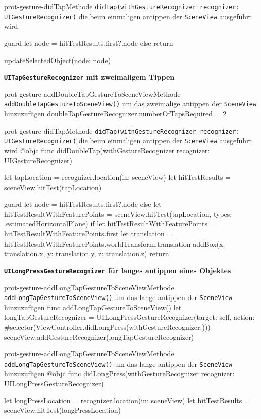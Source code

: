 \begin{description}
\begin{code}{prot-gesture-didTap}{Methode \texttt{didTap(withGestureRecognizer recognizer: UIGestureRecognizer)} die beim einmaligen antippen der \texttt{SceneView} ausgeführt wird}
{        guard let node = hitTestResults.first?.node else {return}
        
        updateSelectedObject(node: node)
    }
    \end{code}

    \textbf{\texttt{UITapGestureRecognizer} mit zweimaligem Tippen}\\

    \begin{code}{prot-gesture-addDoubleTapGestureToSceneView}{Methode \texttt{addDoubleTapGestureToSceneView()} um das zweimalige antippen der \texttt{SceneView} hinzuzufügen}
    doubleTapGestureRecognizer.numberOfTapsRequired = 2
    \end{code}

    \begin{code}{prot-gesture-didTap}{Methode \texttt{didTap(withGestureRecognizer recognizer: UIGestureRecognizer)} die beim einmaligen antippen der \texttt{SceneView} ausgeführt wird}
    @objc
    func didDoubleTap(withGestureRecognizer recognizer: UIGestureRecognizer) {
        let tapLocation = recognizer.location(in: sceneView)
        let hitTestResults = sceneView.hitTest(tapLocation)
        
        guard let node = hitTestResults.first?.node else {
            let hitTestResultWithFeaturePoints = sceneView.hitTest(tapLocation, types: .estimatedHorizontalPlane)
            if let hitTestResultWithFeaturePoints = hitTestResultWithFeaturePoints.first {
                let translation = hitTestResultWithFeaturePoints.worldTransform.translation
                addBox(x: translation.x, y: translation.y, z: translation.z)
            }
            return
        }
    }
    \end{code}

    \textbf{\texttt{UILongPressGestureRecognizer} für langes antippen eines Objektes}\\

    \begin{code}{prot-gesture-addLongTapGestureToSceneView}{Methode \texttt{addLongTapGestureToSceneView()} um das lange antippen der \texttt{SceneView} hinzuzufügen}
    func addLongTapGestureToSceneView() {
        let longTapGestureRecognizer = UILongPressGestureRecognizer(target: self, action: #selector(ViewController.didLongPress(withGestureRecognizer:)))
        sceneView.addGestureRecognizer(longTapGestureRecognizer)
    }
    \end{code}

    \begin{code}{prot-gesture-addLongTapGestureToSceneView}{Methode \texttt{addLongTapGestureToSceneView()} um das lange antippen der \texttt{SceneView} hinzuzufügen}
    @objc
    func didLongPress(withGestureRecognizer recognizer: UILongPressGestureRecognizer) {
        let longPressLocation = recognizer.location(in: sceneView)
        let hitTestResults = sceneView.hitTest(longPressLocation)
        
}
\end{code}
\end{description}
